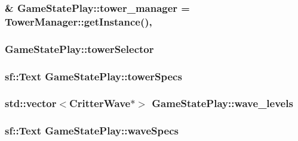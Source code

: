 \hypertarget{class_game_state_play_a951af277d5a8a7fca23fe3240be847c9}{
\subsubsection[{tower\+\_\+manager}]{ \& Game\+State\+Play\+::tower\+\_\+manager = {\bf Tower\+Manager\+::get\+Instance}()\hspace{0.3cm}{\ttfamily [static]}, {\ttfamily [private]}}}\label{class_game_state_play_a951af277d5a8a7fca23fe3240be847c9}
\hypertarget{class_game_state_play_ac22880bd1c34ebbe5d45182caaaf2523}{
\subsubsection[{tower\+Selector}]{ Game\+State\+Play\+::tower\+Selector\hspace{0.3cm}{\ttfamily [private]}}}\label{class_game_state_play_ac22880bd1c34ebbe5d45182caaaf2523}
\hypertarget{class_game_state_play_add98cf58c2cc6af809cade72be6c6c0a}{
\subsubsection[{tower\+Specs}]{\setlength{\rightskip}{0pt plus 5cm}sf\+::\+Text Game\+State\+Play\+::tower\+Specs\hspace{0.3cm}{\ttfamily [private]}}}\label{class_game_state_play_add98cf58c2cc6af809cade72be6c6c0a}
\hypertarget{class_game_state_play_a97b5c39127688b4c5ddb147572f77290}{
\subsubsection[{wave\+\_\+levels}]{\setlength{\rightskip}{0pt plus 5cm}std\+::vector$<${\bf Critter\+Wave}$\ast$$>$ Game\+State\+Play\+::wave\+\_\+levels\hspace{0.3cm}{\ttfamily [private]}}}\label{class_game_state_play_a97b5c39127688b4c5ddb147572f77290}
\hypertarget{class_game_state_play_a61669dc94331d0302f3a0f5792304049}{
\subsubsection[{wave\+Specs}]{\setlength{\rightskip}{0pt plus 5cm}sf\+::\+Text Game\+State\+Play\+::wave\+Specs\hspace{0.3cm}{\ttfamily [private]}}}\label{class_game_state_play_a61669dc94331d0302f3a0f5792304049}


